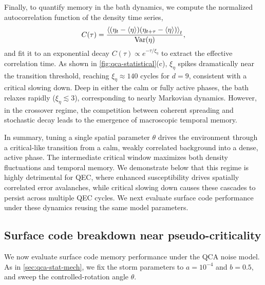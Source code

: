 \documentclass[
    aps,
    prx,
    reprint,
    superscriptaddress,
    longbibliography,
    nofootinbib,
    floatfix,
]{revtex4-2}
\begin{document}
Finally, to quantify memory in the bath dynamics, we compute the normalized autocorrelation function of the density time series,
\begin{equation}
    C(\tau) = \frac{\braket{(\eta_t - \braket{\eta})(\eta_{t + \tau} - \braket{\eta})}_t}{\mathrm{Var}(\eta)},
\end{equation}
and fit it to an exponential decay \(C(\tau) \propto e^{-\tau/\xi_\eta}\) to extract the effective correlation time. As shown in \cref{fig:qca-statistical}(c), \(\xi_\eta\) spikes dramatically near the transition threshold, reaching \(\xi_\eta \approx 140\) cycles for \(d=9\), consistent with a critical slowing down. Deep in either the calm or fully active phases, the bath relaxes rapidly (\(\xi_\eta \lesssim 3\)), corresponding to nearly Markovian dynamics. However, in the crossover regime, the competition between coherent spreading and stochastic decay leads to the emergence of macroscopic temporal memory.

In summary, tuning a single spatial parameter \(\theta\) drives the environment through a critical-like transition from a calm, weakly correlated background into a dense, active phase. The intermediate critical window maximizes both density fluctuations and temporal memory. We demonstrate below that this regime is highly detrimental for QEC, where enhanced susceptibility drives spatially correlated error avalanches, while critical slowing down causes these cascades to persist across multiple QEC cycles. We next evaluate surface code performance under these dynamics reusing the same model parameters.

\subsection{Surface code breakdown near pseudo-criticality}\label{sec:qca-qec-results}
We now evaluate surface code memory performance under the QCA noise model. As in 
\cref{sec:qca-stat-mech}, we fix the storm parameters to \(a=10^{-4}\) and \(b=0.5\), and sweep the controlled-rotation angle \(\theta\).
\end{document}
